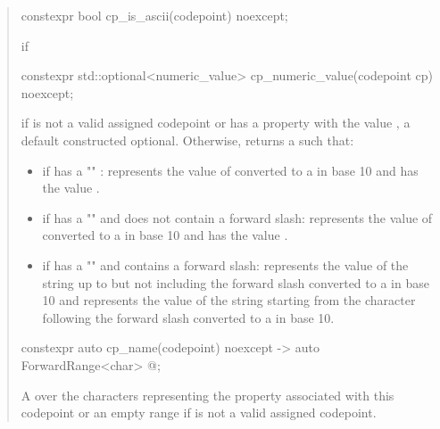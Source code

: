 \documentclass{wg21}
\begin{document}
\begin{quote}
\begin{itemdescr}
\end{itemdescr}

\begin{itemdecl}
constexpr bool cp_is_ascii(codepoint) noexcept;
\end{itemdecl}

\begin{itemdescr}

\returns {} if 

\end{itemdescr}


\begin{itemdecl}
constexpr std::optional<numeric_value>
cp_numeric_value(codepoint cp) noexcept;
\end{itemdecl}

\begin{itemdescr}

\returns if  is not a valid assigned codepoint or has a  property with the value , a default constructed optional.
Otherwise, returns a  such that:

\begin{itemize}
    \item if  has a ""    :  represents the value of  converted to a  in base 10 and  has the value .
    \item if  has a ""  and  does not contain a forward slash:  represents the value of  converted to a  in base 10 and  has the value .
    \item if  has a ""  and  contains a forward slash:  represents the value of the  string up to but not including the forward slash converted to a  in base 10 and   represents the value of the  string starting from the character following the forward slash converted to a  in base 10.
\end{itemize}

\end{itemdescr}

\begin{itemdecl}
constexpr auto cp_name(codepoint) noexcept
-> auto ForwardRange<char> @\seebelow@;
\end{itemdecl}

\begin{itemdescr}

\returns A  over the characters representing the  property associated with this codepoint or an empty range if  is not a valid assigned codepoint.

\end{itemdescr}



\end{quote}
\end{document}
